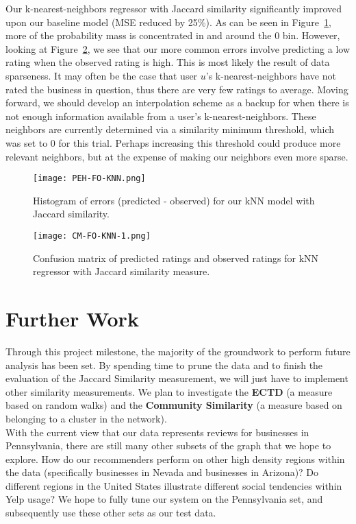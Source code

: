 \documentclass[10pt]{article}
\begin{document}
Our k-nearest-neighbors regressor with Jaccard similarity significantly improved upon our baseline model (MSE reduced by 25\%). As can be seen in Figure~\ref{fig: friendshiphisto}, more of the probability mass is concentrated in and around the 0 bin. However, looking at Figure~\ref{fig: friendshipconfusion}, we see that our more common errors involve predicting a low rating when the observed rating is high. This is most likely the result of data sparseness. It may often be the case that user $u$'s k-nearest-neighbors have not rated the business in question, thus there are very few ratings to average. Moving forward, we should develop an interpolation scheme as a backup for when there is not enough information available from a user's k-nearest-neighbors. These neighbors are currently determined via a similarity minimum threshold, which was set to 0 for this trial. Perhaps increasing this threshold could produce more relevant neighbors, but at the expense of making our neighbors even more sparse.

\begin{figure}[h!]
\centering
\texttt{[image: PEH-FO-KNN.png]}
\caption{Histogram of errors (predicted - observed) for our kNN model with Jaccard similarity.}
\label{fig: friendshiphisto}
\end{figure}

\begin{figure}[h!]
\centering
\texttt{[image: CM-FO-KNN-1.png]}
\caption{Confusion matrix of predicted ratings and observed ratings for kNN regressor with Jaccard similarity measure.}
\label{fig: friendshipconfusion}
\end{figure}

\pagebreak

\section{Further Work}

Through this project milestone, the majority of the groundwork to perform future analysis has been set. By spending time to prune the data and to finish the evaluation of the Jaccard Similarity measurement, we will just have to implement other similarity measurements. We plan to investigate the \textbf{ECTD} (a measure based on random walks) and the \textbf{Community Similarity} (a measure based on belonging to a cluster in the network). \\

With the current view that our data represents reviews for businesses in Pennsylvania, there are still many other subsets of the graph that we hope to explore. How do our recommenders perform on other high density regions within the data (specifically businesses in Nevada and businesses in Arizona)? Do different regions in the United States illustrate different social tendencies within Yelp usage? We hope to fully tune our system on the Pennsylvania set, and subsequently use these other sets as our test data. \\
\end{document}
